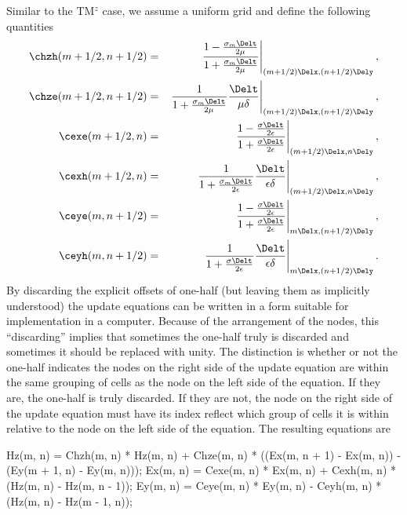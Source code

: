 Similar to the TM$^z$ case, we assume a uniform grid and define the
following quantities
\begin{eqnarray}
\chzh(m+1/2,n+1/2) &=&
  \left.
    \frac{1-\frac{\sigma_m\Delt}{2\mu}}{1+\frac{\sigma_m\Delt}{2\mu}}
  \right|_{(m+1/2)\Delx,(n+1/2)\Dely}, \\
\chze(m+1/2,n+1/2) &=&
  \left.
    \frac{1}{1+\frac{\sigma_m\Delt}{2\mu}}\frac{\Delt}{\mu\delta}
  \right|_{(m+1/2)\Delx,(n+1/2)\Dely}, \\
\cexe(m+1/2,n) &=&
  \left.
    \frac{1-\frac{\sigma\Delt}{2\epsilon}}{1+\frac{\sigma\Delt}{2\epsilon}}
  \right|_{(m+1/2)\Delx,n\Dely}, \\
\cexh(m+1/2,n) &=&
  \left.
    \frac{1}{1+\frac{\sigma_m\Delt}{2\epsilon}}\frac{\Delt}{\epsilon\delta}
  \right|_{(m+1/2)\Delx,n\Dely}, \\
\ceye(m,n+1/2) &=& 
  \left.
  \frac{1-\frac{\sigma\Delt}{2\epsilon}}{1+\frac{\sigma\Delt}{2\epsilon}}
  \right|_{m\Delx,(n+1/2)\Dely}, \\
\ceyh(m,n+1/2) &=& 
  \left.
  \frac{1}{1+\frac{\sigma\Delt}{2\epsilon}}
    \frac{\Delt}{\epsilon\delta}
  \right|_{m\Delx,(n+1/2)\Dely}.
\end{eqnarray}
By discarding the explicit offsets of one-half (but leaving them as
implicitly understood) the update equations can be written in a form
suitable for implementation in a computer.  Because of the arrangement
of the nodes, this ``discarding'' implies that sometimes the one-half
truly is discarded and sometimes it should be replaced with unity.
The distinction is whether or not the one-half indicates the nodes on
the right side of the update equation are within the same grouping of
cells as the node on the left side of the equation.  If they are, the
one-half is truly discarded.  If they are not, the node on the right
side of the update equation must have its index reflect which group of
cells it is within relative to the node on the left side of the
equation.  The resulting equations are
\begin{code}
  Hz(m, n) = Chzh(m, n) * Hz(m, n) +
     Chze(m, n) * ((Ex(m, n + 1) - Ex(m, n)) -
                   (Ey(m + 1, n) - Ey(m, n)));
  Ex(m, n) = Cexe(m, n) * Ex(m, n) +
     Cexh(m, n) * (Hz(m, n) - Hz(m, n - 1));
  Ey(m, n) = Ceye(m, n) * Ey(m, n) -
     Ceyh(m, n) * (Hz(m, n) - Hz(m - 1, n));
\end{code}

